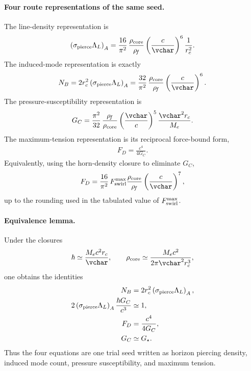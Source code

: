 \paragraph{Four route representations of the same seed.}
The line-density representation is
\begin{align}
    \left(\sigma_{\rm pierce}\Lambda_L\right)_{A}
    =
    \frac{16}{\pi^2}\,
    \frac{\rho_{\rm core}}{\rho_{\!f}}
    \left(\frac{c}{\vchar}\right)^6
    \frac{1}{r_c^2} .
    \label{eq:rt_planck_route_A_single_seed}
\end{align}
The induced-mode representation is exactly
\begin{align}
    N_B
    =
    2r_c^2
    \left(\sigma_{\rm pierce}\Lambda_L\right)_{A}
    =
    \frac{32}{\pi^2}\,
    \frac{\rho_{\rm core}}{\rho_{\!f}}
    \left(\frac{c}{\vchar}\right)^6 .
    \label{eq:rt_planck_route_B_single_seed}
\end{align}
The pressure-susceptibility representation is
\begin{align}
    G_C
    =
    \frac{\pi^2}{32}\,
    \frac{\rho_{\!f}}{\rho_{\rm core}}
    \left(\frac{\vchar}{c}\right)^5
    \frac{\vchar^2r_c}{M_e} .
    \label{eq:rt_planck_route_C_single_seed}
\end{align}
The maximum-tension representation is its reciprocal force-bound form,
\begin{align}
    F_D
    =
    \frac{c^4}{4G_C}.
    \label{eq:rt_planck_route_D_single_seed}
\end{align}
Equivalently, using the horn-density closure to eliminate \(G_C\),
\begin{align}
    F_D
    =
    \frac{16}{\pi^2}\,
    F_{\rm swirl}^{\max}
    \frac{\rho_{\rm core}}{\rho_{\!f}}
    \left(\frac{c}{\vchar}\right)^7,
\end{align}
up to the rounding used in the tabulated value of \(F_{\rm swirl}^{\max}\).

\paragraph{Equivalence lemma.}
Under the closures
\begin{align}
    \hbar\simeq\frac{M_ec^2r_c}{\vchar},
    \qquad
    \rho_{\rm core}\simeq
    \frac{M_ec^2}{2\pi\vchar^2r_c^3},
\end{align}
one obtains the identities
\begin{align}
    N_B
    &=
    2r_c^2
    \left(\sigma_{\rm pierce}\Lambda_L\right)_A,
    \\
    2\left(\sigma_{\rm pierce}\Lambda_L\right)_A
    \frac{\hbar G_C}{c^3}
    &\simeq
    1,
    \\
    F_D
    &=
    \frac{c^4}{4G_C},
    \\
    G_C
    &\simeq
    G_{\star}.
\end{align}
Thus the four equations are one trial seed written as horizon piercing density,
induced mode count, pressure susceptibility, and maximum tension.


